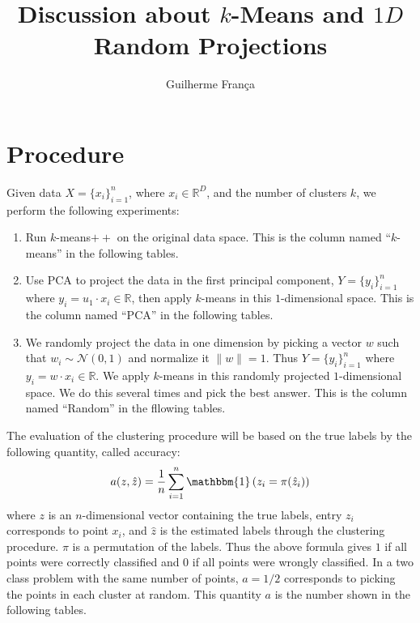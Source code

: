\documentclass[aps,preprint,nofootinbib,floatfix]{revtex4-1}
\begin{document}
\title{Discussion about $k$-Means and $1D$ Random Projections}

\author{Guilherme Fran\c ca}

\maketitle

\section{Procedure}

Given data $X=\{ x_i \}_{i=1}^{n}$, where $x_i \in \mathbb{R}^{D}$, 
and the number of clusters $k$, we perform the following experiments:
\begin{enumerate}
\item Run $k$-means$++$ 
on the original data space. This is the column named 
``$k$-means'' in the following tables.
\item Use PCA to 
project the data in the first principal component, 
$Y=\{ y_i \}_{i=1}^n$ where $y_i = u_{1}\cdot x_i \in \mathbb{R}$, then
apply $k$-means in this $1$-dimensional space. This is the column named
``PCA'' in the following tables.
\item We randomly project the data in one dimension by picking a vector
$w$ such that $w_i \sim \mathcal{N}(0,1)$ and normalize it $\| w \|=1$.
Thus $Y = \{y_i\}_{i=1}^n $ where $y_i = w\cdot x_i \in \mathbb{R}$. 
We apply $k$-means in this randomly projected
$1$-dimensional space. We do this several times and pick the best answer.
This is the column named ``Random'' in the fllowing tables.
\end{enumerate}

The evaluation of the clustering procedure 
will be based on the true labels by the following quantity, called
accuracy:
\begin{equation}
\label{eq:accuracy}
a(z,\hat{z}) = 
\dfrac{1}{n}\sum_{i=1}^{n} \mathbbm{1}\left(z_i = \pi(\hat{z}_i) \right)
\end{equation}
where $z$ is an $n$-dimensional vector containing the true labels, entry
$z_i$ corresponds to point $x_i$, and $\hat{z}$ is the estimated labels
through the clustering procedure. $\pi$ is a permutation of the labels.
Thus the above formula gives $1$ if all points were correctly classified and
$0$ if all points were wrongly classified. In a two class problem with
the same number of points, $a=1/2$ corresponds to picking the points in each
cluster at random. This quantity $a$ is the number shown in the following tables.
\end{document}
